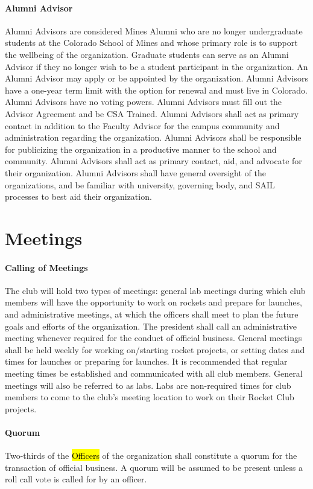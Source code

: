 \documentclass[12pt]{article}
\begin{document}
\paragraph{Alumni Advisor}
Alumni Advisors are considered Mines Alumni who are no longer undergraduate students at the Colorado School of Mines and whose primary role is to support the wellbeing of the organization. 
Graduate students can serve as an Alumni Advisor if they no longer wish to be a student participant in the organization. 
An Alumni Advisor may apply or be appointed by the organization. Alumni Advisors have a one-year term limit with the option for renewal and must live in Colorado. 
Alumni Advisors have no voting powers. Alumni Advisors must fill out the Advisor Agreement and be CSA Trained. 
Alumni Advisors shall act as primary contact in addition to the Faculty Advisor for the campus community and administration regarding the organization. 
Alumni Advisors shall be responsible for publicizing the organization in a productive manner to the school and community. 
Alumni Advisors shall act as primary contact, aid, and advocate for their organization. 
Alumni Advisors shall have general oversight of the organizations, and be familiar with university, governing body, and SAIL processes to best aid their organization.

\section{Meetings}
\paragraph{Calling of Meetings}
The club will hold two types of meetings: 
general lab meetings during which club members will have the opportunity to work on rockets and prepare for launches, 
and administrative meetings, 
at which the officers shall meet to plan the future goals and efforts of the organization.
The president shall call an administrative meeting whenever required for the conduct of official business. 
General meetings shall be held weekly for working on/starting rocket projects, 
or setting dates and times for launches or preparing for launches. 
It is recommended that regular meeting times be established and communicated with all club members. 
General meetings will also be referred to as labs. 
Labs are non-required times for club members to come to the club's meeting location to work on their Rocket Club projects. 
\paragraph{Quorum}
Two-thirds of the \hl{Officers} of the organization shall constitute a quorum for the transaction of official business. 
A quorum will be assumed to be present unless a roll call vote is called for by an officer.
\end{document}
